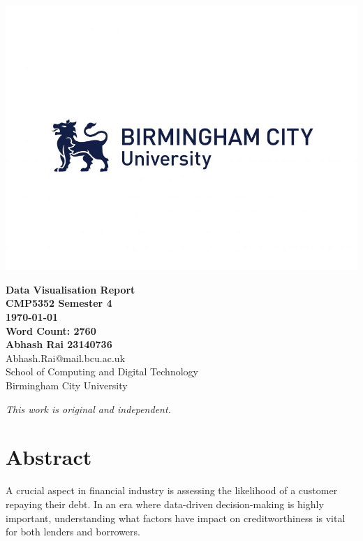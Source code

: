 \documentclass{article}\usepackage[]{graphicx}\usepackage[]{xcolor}
\begin{document}

\begin{center}
    \vspace{-1cm}  
    \includegraphics[width=\textwidth]{images/bcu-logo.jpg}
\end{center}

\vspace{2cm}  
\noindent \Huge {\textbf{Data Visualisation Report}} \\
\normalsize \textbf{CMP5352 Semester 4}\\
\normalsize \textbf{\today}\\[1cm]

\noindent \normalsize \textbf{Word Count: 2760}\\[1cm]

\noindent \normalsize \textbf{Abhash Rai 23140736} \\
\small Abhash.Rai@mail.bcu.ac.uk \\
\small School of Computing and Digital Technology \\
\small Birmingham City University

\vfill
\hspace*{\fill}\large \textit{This work is original and independent.}\hspace*{\fill}

\restoregeometry
{}
\newpage


\tableofcontents
\newpage

\listoffigures
\newpage

\section*{Abstract}
A crucial aspect in financial industry is assessing the likelihood of a customer repaying their debt. In an era where data-driven decision-making is highly important, understanding what factors have impact on creditworthiness is vital for both lenders and borrowers.\\
\end{document}
